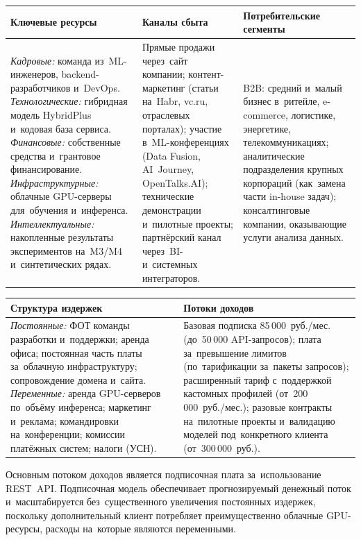 {\footnotesize
\begin{longtable}{L{5.0cm} L{5.0cm} L{5.0cm}}
\toprule
\textbf{Ключевые ресурсы} & \textbf{Каналы сбыта} & \textbf{Потребительские сегменты} \\
\midrule
\endhead
\textit{Кадровые:} команда из~ML-инженеров, backend-разработчиков и~DevOps. \textit{Технологические:} гибридная модель HybridPlus и~кодовая база сервиса. \textit{Финансовые:} собственные средства и~грантовое финансирование. \textit{Инфраструктурные:} облачные GPU-серверы для~обучения и~инференса. \textit{Интеллектуальные:} накопленные результаты экспериментов на~M3/M4 и~синтетических рядах. & Прямые продажи через~сайт компании; контент-маркетинг (статьи на~Habr, vc.ru, отраслевых порталах); участие в~ML-конференциях (Data Fusion, AI~Journey, OpenTalks.AI); технические демонстрации и~пилотные проекты; партнёрский канал через~BI- и~системных интеграторов. & B2B: средний и~малый бизнес в~ритейле, e-commerce, логистике, энергетике, телекоммуникациях; аналитические подразделения крупных корпораций (как~замена части in-house задач); консалтинговые компании, оказывающие услуги анализа данных. \\
\bottomrule
\end{longtable}
}

{\footnotesize
\begin{longtable}{L{7.6cm} L{7.6cm}}
\toprule
\textbf{Структура издержек} & \textbf{Потоки доходов} \\
\midrule
\endhead
\textit{Постоянные:} ФОТ команды разработки и~поддержки; аренда офиса; постоянная часть платы за~облачную инфраструктуру; сопровождение домена и~сайта. \textit{Переменные:} аренда GPU-серверов по~объёму инференса; маркетинг и~реклама; командировки на~конференции; комиссии платёжных систем; налоги (УСН). & Базовая подписка 85\,000~руб./мес. (до~50\,000 API-запросов); плата за~превышение лимитов (по~тарификации за~пакеты запросов); расширенный тариф с~поддержкой кастомных профилей (от~200\,000~руб./мес.); разовые контракты на~пилотные проекты и~валидацию моделей под~конкретного клиента (от~300\,000~руб.). \\
\bottomrule
\end{longtable}
}

Основным потоком доходов является подписочная плата за~использование REST~API.
Подписочная модель обеспечивает прогнозируемый денежный поток и~масштабируется
без~существенного увеличения постоянных издержек, поскольку дополнительный
клиент потребляет преимущественно облачные GPU-ресурсы, расходы на~которые
являются переменными.

